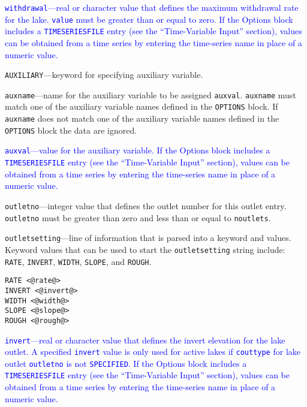 \item \textcolor{blue}{\texttt{withdrawal}---real or character value that defines the maximum withdrawal rate for the lake. \texttt{value} must be greater than or equal to zero. If the Options block includes a \texttt{TIMESERIESFILE} entry (see the ``Time-Variable Input'' section), values can be obtained from a time series by entering the time-series name in place of a numeric value.}

\item \texttt{AUXILIARY}---keyword for specifying auxiliary variable.

\item \texttt{auxname}---name for the auxiliary variable to be assigned \texttt{auxval}.  \texttt{auxname} must match one of the auxiliary variable names defined in the \texttt{OPTIONS} block. If \texttt{auxname} does not match one of the auxiliary variable names defined in the \texttt{OPTIONS} block the data are ignored.

\item \textcolor{blue}{\texttt{auxval}---value for the auxiliary variable. If the Options block includes a \texttt{TIMESERIESFILE} entry (see the ``Time-Variable Input'' section), values can be obtained from a time series by entering the time-series name in place of a numeric value.}

\item \texttt{outletno}---integer value that defines the outlet number for this outlet entry. \texttt{outletno} must be greater than zero and less than or equal to \texttt{noutlets}.

\item \texttt{outletsetting}---line of information that is parsed into a keyword and values.  Keyword values that can be used to start the \texttt{outletsetting} string include: \texttt{RATE}, \texttt{INVERT}, \texttt{WIDTH}, \texttt{SLOPE}, and \texttt{ROUGH}.

\begin{lstlisting}[style=blockdefinition]
RATE <@rate@>
INVERT <@invert@>
WIDTH <@width@>
SLOPE <@slope@>
ROUGH <@rough@>
\end{lstlisting}

\item \textcolor{blue}{\texttt{invert}---real or character value that defines the invert elevation for the lake outlet. A specified \texttt{invert} value is only used for active lakes if \texttt{couttype} for lake outlet \texttt{outletno} is not \texttt{SPECIFIED}. If the Options block includes a \texttt{TIMESERIESFILE} entry (see the ``Time-Variable Input'' section), values can be obtained from a time series by entering the time-series name in place of a numeric value.}

